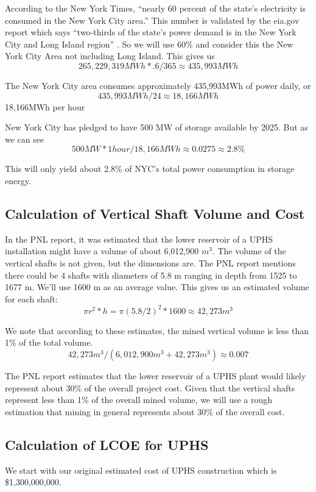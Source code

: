 According to the New York Times, “nearly 60 percent of the state’s electricity is consumed in the New York City area.” \cite{HowNewYorkCityGetsItsElectricity} This number is validated by the eia.gov report which says “two-thirds of the state's power demand is in the New York City and Long Island region” \cite{NewYorkStateEnergyProfile}. So we will use 60\% and consider this the New York City Area not including Long Island. This gives us
\[ 265,229,319MWh * .6  / 365 \approx 435,993MWh \]

The New York City area consumes approximately 435,993MWh of power daily, or
\[ 435,993MWh / 24 \approx 18,166MWh \]
18,166MWh per hour

New York City has pledged to have 500 MW of storage available by 2025. But as we can see
\[ 500MW * 1 hour / 18,166MWh \approx 0.0275 \approx 2.8\% \]

This will only yield about 2.8\% of NYC's total power consumption in storage energy.


\subsection{Calculation of Vertical Shaft Volume and Cost}
In the PNL report, it was estimated that the lower reservoir of a UPHS installation might have a volume of about 6,012,900 $m^3$. The volume of the vertical shafts is not given, but the dimensions are. The PNL report mentions there could be 4 shafts with diameters of 5.8 m ranging in depth from 1525 to 1677 m. \cite{UndergroundPumpedHydroelectricStorage} We'll use 1600 m as an average value. This gives us an estimated volume for each shaft:
\[ \pi r^2 * h = \pi (5.8 / 2)^2 * 1600 \approx 42,273 m^3\]

We note that according to these estimates, the mined vertical volume is less than 1\% of the total volume.
\[ 42,273 m^3 / (6,012,900 m^3 + 42,273 m^3) \approx 0.007 \]

The PNL report estimates that the lower reservoir of a UPHS plant would likely represent about 30\% of the overall project cost. \cite{UndergroundPumpedHydroelectricStorage} Given that the vertical shafts represent less than 1\% of the overall mined volume, we will use a rough estimation that mining in general represents about 30\% of the overall cost.


\subsection{Calculation of LCOE for UPHS}
We start with our original estimated cost of UPHS construction which is \$1,300,000,000.


